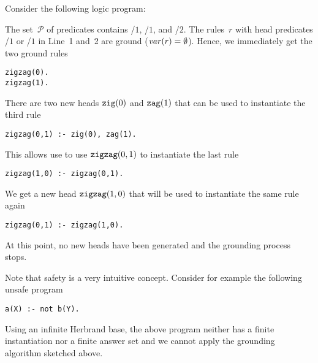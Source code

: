 \begin{newstuff}
\begin{example}\label{ex:safe}
Consider the following logic program:
%

%
The set~$\mathcal{P}$ of predicates contains
/$1$, /$1$,
and /$2$.
The rules~$r$ with head predicates /$1$ or /$1$ in Line~1 and~2
are ground ($\vars{r}=\nolinebreak\emptyset$).
Hence, we immediately get the two ground rules
\begin{lstlisting}[firstnumber=1]
zigzag(0).
zigzag(1).
\end{lstlisting}
There are two new heads $\texttt{zig}(0)$ and $\texttt{zag}(1)$ that can be used to instantiate the third rule
\begin{lstlisting}[firstnumber=3]
zigzag(0,1) :- zig(0), zag(1).
\end{lstlisting}
This allows use to use $\texttt{zigzag}(0,1)$ to instantiate the last rule
\begin{lstlisting}[firstnumber=4]
zigzag(1,0) :- zigzag(0,1).
\end{lstlisting}
We get a new head $\texttt{zigzag}(1,0)$ that will be used to instantiate the same rule again
\begin{lstlisting}[firstnumber=5]
zigzag(0,1) :- zigzag(1,0).
\end{lstlisting}
At this point, no new heads have been generated and the grounding process stops.
\end{example}

\begin{example}\label{ex:unsafe}
Note that safety is a very intuitive concept.
Consider for example the following unsafe program
\begin{lstlisting}[firstnumber=1]
a(X) :- not b(Y).
\end{lstlisting}
Using an infinite Herbrand base, the above program neither has a finite instantiation nor a finite answer set
and we cannot apply the grounding algorithm sketched above.
\end{example}


\end{newstuff}
